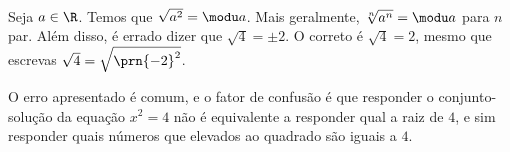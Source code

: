 ~\\

\begin{remark}
    Seja $a \in \R$. Temos que $\sqrt{a^2} = \modu a$. Mais geralmente, $\sqrt[n] {a^n} = \modu a$ para $n$ par. Além disso, é errado dizer que $\sqrt 4 = \pm 2$. O correto é $\sqrt 4 = 2$, mesmo que escrevas $\sqrt 4 = \sqrt{\prn {-2}^2}$. 
    
    O erro apresentado é comum, e o fator de confusão é que responder o conjunto-solução da equação $x^2=4$ não é equivalente a responder qual a raiz de $4$, e sim responder quais números que elevados ao quadrado são iguais a $4$.
\end{remark}